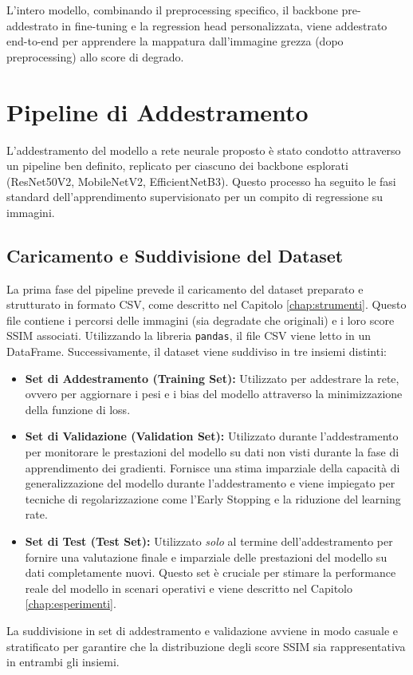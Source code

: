 L'intero modello, combinando il preprocessing specifico, il backbone pre-addestrato in fine-tuning e la regression head personalizzata, viene addestrato end-to-end per apprendere la mappatura dall'immagine grezza (dopo preprocessing) allo score di degrado.
\section{Pipeline di Addestramento}

L'addestramento del modello a rete neurale proposto è stato condotto attraverso un pipeline ben definito, replicato per ciascuno dei backbone esplorati (ResNet50V2, MobileNetV2, EfficientNetB3). Questo processo ha seguito le fasi standard dell'apprendimento supervisionato per un compito di regressione su immagini.

\subsection{Caricamento e Suddivisione del Dataset}

La prima fase del pipeline prevede il caricamento del dataset preparato e strutturato in formato CSV, come descritto nel Capitolo \ref{chap:strumenti}. Questo file contiene i percorsi delle immagini (sia degradate che originali) e i loro score SSIM associati. Utilizzando la libreria \texttt{pandas}, il file CSV viene letto in un DataFrame. Successivamente, il dataset viene suddiviso in tre insiemi distinti:
\begin{itemize}
    \item \textbf{Set di Addestramento (Training Set):} Utilizzato per addestrare la rete, ovvero per aggiornare i pesi e i bias del modello attraverso la minimizzazione della funzione di loss.
    \item \textbf{Set di Validazione (Validation Set):} Utilizzato durante l'addestramento per monitorare le prestazioni del modello su dati non visti durante la fase di apprendimento dei gradienti. Fornisce una stima imparziale della capacità di generalizzazione del modello durante l'addestramento e viene impiegato per tecniche di regolarizzazione come l'Early Stopping e la riduzione del learning rate.
    \item \textbf{Set di Test (Test Set):} Utilizzato \textit{solo} al termine dell'addestramento per fornire una valutazione finale e imparziale delle prestazioni del modello su dati completamente nuovi. Questo set è cruciale per stimare la performance reale del modello in scenari operativi e viene descritto nel Capitolo \ref{chap:esperimenti}.
\end{itemize}
La suddivisione in set di addestramento e validazione avviene in modo casuale e stratificato per garantire che la distribuzione degli score SSIM sia rappresentativa in entrambi gli insiemi.

